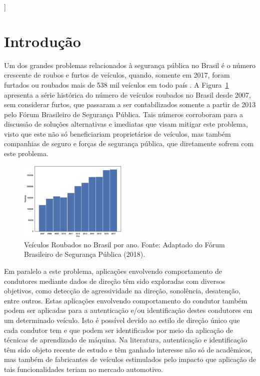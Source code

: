 \documentclass[conference,harvard,brazil,english]{sbatex}
\begin{document}
]



\section{Introdução}

Um dos grandes problemas relacionados à segurança pública no Brasil é o número crescente de roubos e furtos de veículos, quando, somente em 2017, foram furtados ou roubados mais de 538 mil veículos em todo país \cite{fbsp2018}. A Figura~\ref{fig:roubos} apresenta a série histórica do número de veículos roubados no Brasil desde 2007, sem considerar furtos, que passaram a ser contabilizados somente a partir de 2013 pelo Fórum Brasileiro de Segurança Pública. Tais números corroboram para a discussão de soluções alternativas e imediatas que visam mitigar este problema, visto que este não só beneficiariam proprietários de veículos, mas também companhias de seguro e forças de segurança pública, que diretamente sofrem com este problema.

\begin{figure}[ht]
\centering
\includegraphics[width=0.46\textwidth]{roubos.eps} \caption{Veículos Roubados no Brasil por ano. Fonte: Adaptado do Fórum Brasileiro de Segurança Pública (2018).}
\label{fig:roubos} 
\end{figure}

Em paralelo a este problema, aplicações envolvendo comportamento de condutores mediante dados de direção têm sido exploradas com diversos objetivos, como detecção de agressividade na direção, sonolência, desatenção, entre outros. Estas aplicações envolvendo comportamento do condutor também podem ser aplicadas para a autenticação e/ou identificação destes condutores em um determinado veículo. Isto é possível devido ao estilo de direção único que cada condutor tem e que podem ser identificados por meio da aplicação de técnicas de aprendizado de máquina. Na literatura, autenticação e identificação têm sido objeto recente de estudo e têm ganhado interesse não só de acadêmicos, mas também de fabricantes de veículos estimulados pelo impacto que aplicação de tais funcionalidades teriam no mercado automotivo.
\end{document}
